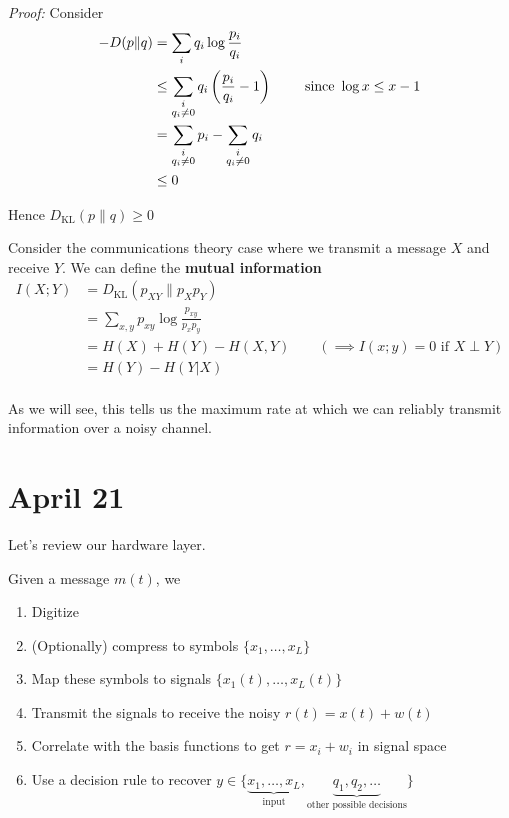 \documentclass[12pt]{report}
\newcommand*{\tbf}[1]{\ifmmode\mathbf{#1}\else\textbf{#1}\fi}
\newenvironment*{tbox}[2][gray]{
    \begin{tcolorbox}[
        parbox=false,
        colback=#1!5!white,
        colframe=#1!75!black,
        breakable,
        title={#2}
    ]}
    {\end{tcolorbox}}
\begin{document}
\begin{tbox}{\textbf{Proposition:} $D_{\text{KL}}(p \| q) \geq 0$ with equality if and only if $p = q$.}
    \emph{Proof:} Consider 
    \begin{align*}
        -D(p \| q) &= \sum_i q_i \log \frac{p_i}{q_i}\\ 
        &\leq \sum_{\begin{subarray}{c}
            i\\ q_i \neq 0
        \end{subarray}} q_i \left(\frac{p_i}{q_i} - 1\right) \qquad \text{ since } \log x \leq x - 1\\ 
        &= \sum_{\begin{subarray}{c}
            i\\ q_i \neq 0
        \end{subarray}} p_i - \sum_{\begin{subarray}{c}
            i\\ q_i \neq 0
        \end{subarray}} q_i\\ 
        &\leq 0
    \end{align*}

    Hence $D_{\text{KL}}(p \| q) \geq 0$   
    \end{tbox}

Consider the communications theory case where we transmit a message $X$ and receive $Y$. We can define the \tbf{mutual information}
\begin{align*}
    I(X; Y) &= D_{\text{KL}}(p_{XY} \| p_X p_Y)\\ 
    &= \sum_{x,y} p_{xy} \log \frac{p_{xy}}{p_x p_y}\\ 
    &= H(X) + H(Y) - H(X, Y) \qquad (\implies I(x; y) = 0 \text{ if } X \perp Y)\\ 
    &= H(Y) - H(Y | X)\\
\end{align*}

As we will see, this tells us the maximum rate at which we can reliably transmit information over a noisy channel.

\section{April 21}

Let's review our hardware layer. 

Given a message $m(t)$, we 
\begin{enumerate}
    \item Digitize 
    \item (Optionally) compress to symbols $\{x_1, \dots, x_L\}$ 
    \item Map these symbols to signals $\{x_1(t), \dots, x_L(t)\}$
    \item Transmit the signals to receive the noisy $r(t) = x(t) + w(t)$
    \item Correlate with the basis functions to get $r = x_i + w_i$ in signal space
    \item Use a decision rule to recover $y \in \{\underbrace{x_1, \dots, x_L}_{\text{input}}, \underbrace{q_1, q_2, \dots}_{\text{other possible decisions}} \}$
\end{enumerate}
\end{document}
